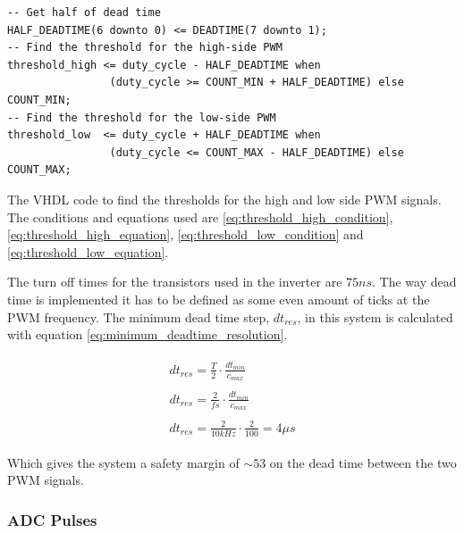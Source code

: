 \begin{verbatim}
-- Get half of dead time
HALF_DEADTIME(6 downto 0) <= DEADTIME(7 downto 1);
-- Find the threshold for the high-side PWM
threshold_high <= duty_cycle - HALF_DEADTIME when 
                (duty_cycle >= COUNT_MIN + HALF_DEADTIME) else COUNT_MIN;
-- Find the threshold for the low-side PWM
threshold_low  <= duty_cycle + HALF_DEADTIME when 
                (duty_cycle <= COUNT_MAX - HALF_DEADTIME) else COUNT_MAX;
\end{verbatim}
\begin{center}
    The VHDL code to find the thresholds for the high and low side PWM signals. The conditions and equations used are \ref{eq:threshold_high_condition}, \ref{eq:threshold_high_equation}, \ref{eq:threshold_low_condition} and \ref{eq:threshold_low_equation}.
\end{center}



The turn off times for the transistors used in the inverter are $75ns$.
The way dead time is implemented it has to be defined as some even amount of ticks at the PWM frequency.
The minimum dead time step, $dt_{res}$, in this system is calculated with equation \ref{eq:minimum_deadtime_resolution}.

\begin{subequations}
    \begin{align}
        \begin{split}
            dt_{res} = \frac{T}{2} \cdot \frac{dt_{min}}{c_{max}}
        \end{split} \\ 
        \begin{split}
             dt_{res} = \frac{2}{fs} \cdot \frac{dt_{min}}{c_{max}}
        \end{split} \\ 
        \begin{split}
             dt_{res} = \frac{2}{10kHz} \cdot \frac{2}{100} = 4\mu s
        \end{split} 
    \end{align}
    \label{eq:minimum_deadtime_resolution}
\end{subequations}

Which gives the system a safety margin of $\sim 53$ on the dead time between the two PWM signals.


\subsubsection*{ADC Pulses}

